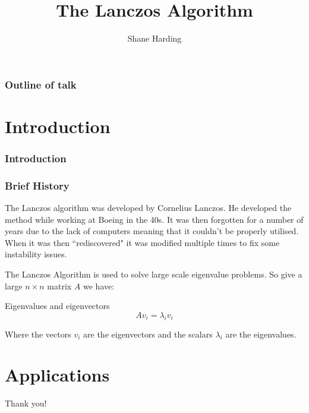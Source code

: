 \documentclass[pdf]{beamer}
\title{The Lanczos Algorithm}
\author{Shane Harding}
\begin{document}
\begin{frame}
\titlepage
\end{frame}


\begin{frame}
\frametitle{Outline of talk}
\tableofcontents[]

\end{frame}


\section{Introduction}

\begin{frame}
\tableofcontents[currentsection]
\end{frame}


\begin{frame}
\frametitle{Introduction}
\centering


\end{frame}

\begin{frame}
\centering
\frametitle{Brief History}
The Lanczos algorithm was developed by Cornelius Lanczos. He developed the method while working at Boeing in the 40s. It was then forgotten for a number of years due to the lack of computers meaning that it couldn't be properly utilised. When it was then ``rediscovered" it was modified multiple times to fix some instability issues.
\end{frame}






\begin{frame}
\tableofcontents[currentsection]
\end{frame}



\begin{frame}
The Lanczos Algorithm is used to solve large scale eigenvalue problems. So give a large $n \times n$ matrix $A$ we have:
\begin{exampleblock}{Eigenvalues and eigenvectors}
\[
A v_i = \lambda_i v_i
\]
\end{exampleblock}
Where the vectors $v_i$ are the eigenvectors and the scalars $\lambda_i$ are the eigenvalues.
\end{frame}





\begin{frame}
\tableofcontents[currentsection]
\end{frame}


\section{Applications}

\begin{frame}
\centering
Thank you!
\end{frame}
\end{document}
